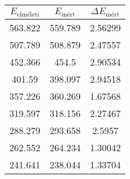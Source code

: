 \begin{center}
\begin{tabular}{|c|c|c|}
\hline
$E_{\text{elméleti}}$ & $E_{\text{mért}}$ & $\Delta E_{\text{mért}}$ \\
\hline
563.822 & 559.789 & 2.56299 \\
\hline
507.789 & 508.879 & 2.47557 \\
\hline
452.366 & 454.5 & 2.90534 \\
\hline
401.59 & 398.097 & 2.94518 \\
\hline
357.226 & 360.269 & 1.67568 \\
\hline
319.597 & 318.156 & 2.27467 \\
\hline
288.279 & 293.658 & 2.5957 \\
\hline
262.552 & 264.234 & 1.30042 \\
\hline
241.641 & 238.044 & 1.33704 \\
\hline
\end{tabular}
\end{center}